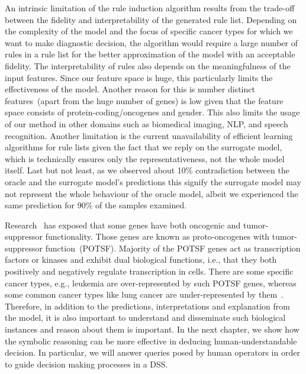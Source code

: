 \hspace*{3.5mm} An intrinsic limitation of the rule induction algorithm results from the trade-off between the fidelity and interpretability of the generated rule list. Depending on the complexity of the model and the focus of specific cancer types for which we want to make diagnostic decision, the algorithm would require a large number of rules in a rule list for the better  approximation of the model with an acceptable fidelity. The interpretability of rules also depends on the meaningfulness of the input features. Since our feature space is huge, this particularly limits the effectiveness of the model. Another reason for this is number distinct features~(apart from the huge number of genes) is low given that the feature space consists of protein-coding/oncogenes and gender. This also limits the usage of our method in other domains such as biomedical imaging, NLP, and speech recognition. Another limitation is the current unavailability of efficient learning algorithms for rule lists given the fact that we reply on the surrogate model, which is technically ensures only the representativeness, not the whole model itself. Last but not least, as we observed about 10\% contradiction between the oracle and the surrogate model's predictions this signify the surrogate model may not represent the whole behaviour of the oracle model, albeit we experienced the same prediction for 90\% of the samples examined. 

\hspace*{3.5mm} Research~\cite{POSTF} has exposed that some genes have both oncogenic and tumor-suppressor functionality. Those genes are known as proto-oncogenes with tumor-suppressor function~(POTSF). Majority of the POTSF genes act as transcription factors or kinases and exhibit dual biological functions, i.e., that they both positively and negatively regulate transcription in cells. There are some specific cancer types, e.g., leukemia are over-represented by such POTSF genes, whereas some common cancer types like lung cancer are under-represented by them~\cite{POSTF}. Therefore, in addition to the predictions, interpretations and explanation from the model, it is also important to understand and disseminate such biological instances and reason about them is important. In the next chapter, we show how the symbolic reasoning can be more effective in deducing human-understandable decision. In particular, we will answer queries posed by human operators in order to guide decision making processes in a DSS. 

